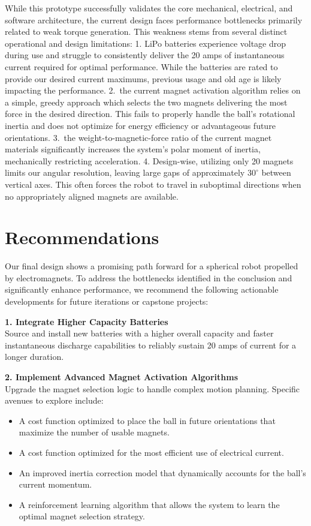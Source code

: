 \documentclass[11pt]{article}
\begin{document}
While this prototype successfully validates the core mechanical, electrical, and software architecture, the current design faces performance bottlenecks primarily related to weak torque generation. This weakness stems from several distinct operational and design limitations: 1. LiPo batteries experience voltage drop during use and struggle to consistently deliver the 20 amps of instantaneous current required for optimal performance. While the batteries are rated to provide our desired current maximums, previous usage and old age is likely impacting the performance. 2.\ the current magnet activation algorithm relies on a simple, greedy approach which selects the two magnets delivering the most force in the desired direction. This fails to properly handle the ball's rotational inertia and does not optimize for energy efficiency or advantageous future orientations. 3.\ the weight-to-magnetic-force ratio of the current magnet materials significantly increases the system's polar moment of inertia, mechanically restricting acceleration. 4. Design-wise, utilizing only 20 magnets limits our angular resolution, leaving large gaps of approximately $30^\circ$ between vertical axes. This often forces the robot to travel in suboptimal directions when no appropriately aligned magnets are available.

\section{Recommendations}
Our final design shows a promising path forward for a spherical robot propelled by electromagnets. To address the bottlenecks identified in the conclusion and significantly enhance performance, we recommend the following actionable developments for future iterations or capstone projects:

\vspace{1em}
\noindent \textbf{1. Integrate Higher Capacity Batteries}\\
Source and install new batteries with a higher overall capacity and faster instantaneous discharge capabilities to reliably sustain 20 amps of current for a longer duration.

\vspace{1em}
\noindent \textbf{2. Implement Advanced Magnet Activation Algorithms}\\
Upgrade the magnet selection logic to handle complex motion planning. Specific avenues to explore include:
\begin{itemize}
    \item A cost function optimized to place the ball in future orientations that maximize the number of usable magnets.
    \item A cost function optimized for the most efficient use of electrical current.
    \item An improved inertia correction model that dynamically accounts for the ball's current momentum.
    \item A reinforcement learning algorithm that allows the system to learn the optimal magnet selection strategy.
\end{itemize}
\end{document}
